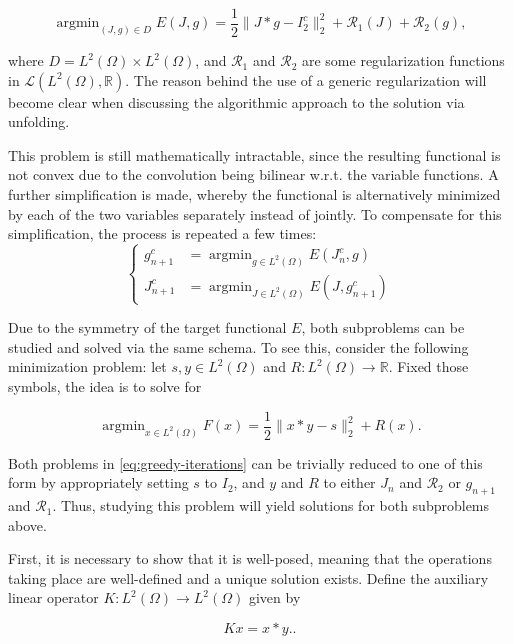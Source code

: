 \documentclass[twocolumn,twoside,a4paper,10pt]{IEEEtran}
\DeclareMathOperator*{\argmin}{\operatorname*{argmin}}
\begin{document}
\begin{equation}\label{eq:full-I2-functional}
  \argmin_{(J, g)\in D} E(J, g) = \frac12\|J\ast g - I_2^c\|_2^2 + \mathcal{R}_1(J) + \mathcal{R}_2(g),
\end{equation}

where \(D = L^2(\Omega)\times L^2(\Omega)\), and \(\mathcal{R}_1\) and \(\mathcal{R}_2\) are some regularization functions in \(\mathcal{L}(L^2(\Omega), \mathbb{R})\). The reason behind the use of a generic regularization will become clear when discussing the algorithmic approach to the solution via unfolding.

This problem is still mathematically intractable, since the resulting functional is not convex due to the convolution being bilinear w.r.t. the variable functions. A further simplification is made, whereby the functional is alternatively minimized by each of the two variables separately instead of jointly. To compensate for this simplification, the process is repeated a few times:
\begin{equation}\label{eq:greedy-iterations}
  \left\{\begin{split}
    g_{n+1}^c &= \argmin_{g\in L^2(\Omega)} E(J_n^c, g) \\
    J_{n+1}^c &= \argmin_{J\in L^2(\Omega)} E(J, g_{n+1}^c)
  \end{split}\right.
\end{equation}

Due to the symmetry of the target functional \(E\), both subproblems can be studied and solved via the same schema. To see this, consider the following minimization problem: let \(s, y\in L^2(\Omega)\) and \(R\colon L^2(\Omega)\to\mathbb{R}\). Fixed those symbols, the idea is to solve for

\[
  \argmin_{x\in L^2(\Omega)}F(x) = \frac12\|x\ast y - s\|_2^2 + R(x)
.\]

Both problems in \cref{eq:greedy-iterations} can be trivially reduced to one of this form by appropriately setting \(s\) to \(I_2\), and \(y\) and \(R\) to either \(J_n\) and \(\mathcal{R}_2\) or \(g_{n+1}\) and \(\mathcal{R}_1\). Thus, studying this problem will yield solutions for both subproblems above.

First, it is necessary to show that it is well-posed, meaning that the operations taking place are well-defined and a unique solution exists. Define the auxiliary linear operator \(K\colon L^2(\Omega)\to L^2(\Omega)\) given by

\[
  Kx=x\ast y.
.\]
\end{document}
